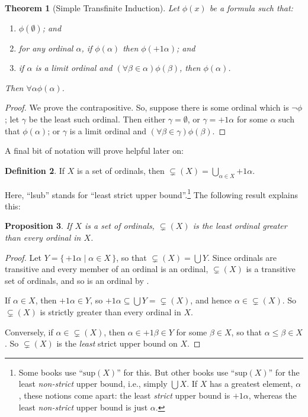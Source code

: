 \documentclass[10pt,a4paper]{article}
\makeatletter
\theoremstyle{plain}
\newtheorem{thm}{Theorem}[section]
\newtheorem{prop}[thm]{Proposition}
\theoremstyle{definition}
\newtheorem{defn}[thm]{Definition}
\theoremstyle{remark}
\newcommand*{\ollabel}[1]{\label{#1}}
\newcommand{\olref}{\@ifnextchar[{\olref@i}{\olref@final}}
\def\olref@i[#1]{\@ifnextchar[{\olref@ii}{\olref@final}}
\def\olref@ii[#1]{\@ifnextchar[{\olref@iii}{\olref@final}}
\def\olref@iii[#1]{\olref@final}
\def\olref@final#1{\ref{#1}}
\providecommand{\ordsucc}{\mathord{+1}}
\providecommand{\Setabs}[2]{\{\, #1 \mid #2 \,\}}
\providecommand{\supstrict}{\subsetneq}
\makeatother
\begin{document}
\begin{thm}[Simple Transfinite Induction]\ollabel{simpletransrecursion}
Let $\phi(x)$ be a formula such that:
\begin{enumerate}
	\item $\phi(\emptyset)$; and
	\item for any ordinal $\alpha$, if $\phi(\alpha)$ then
	$\phi(\ordsucc{\alpha})$; and 
	\item if $\alpha$ is a limit ordinal and $(\forall \beta \in
	\alpha)\phi(\beta)$, then $\phi(\alpha)$.
\end{enumerate}
Then $\forall \alpha \phi(\alpha)$.
\end{thm}

\begin{proof}
We prove the contrapositive. So, suppose there is some ordinal which
is $\lnot\phi$; let $\gamma$ be the least such ordinal. Then either
$\gamma = \emptyset$, or $\gamma = \ordsucc{\alpha}$ for some $\alpha$
such that $\phi(\alpha)$; or $\gamma$ is a limit ordinal and $(\forall
\beta \in \gamma)\phi(\beta)$.
\end{proof}
\noindent
A final bit of notation will prove helpful later on:

\begin{defn}\ollabel{defsupstrict}
If $X$ is a  set of ordinals, then $\supstrict(X) = \bigcup_{\alpha
\in X} \ordsucc{\alpha}$.
\end{defn}
\noindent
Here, ``lsub'' stands for ``least strict upper bound''.\footnote{Some
books use ``$\text{sup}(X)$'' for this.  But other books use
``$\text{sup}(X)$'' for the least \emph{non-strict} upper bound, i.e.,
simply $\bigcup X$. If $X$ has a greatest element, $\alpha$, these
notions come apart: the least \emph{strict} upper bound is
$\ordsucc{\alpha}$, whereas the least \emph{non-strict} upper bound is
just $\alpha$.}  The following result explains this:

\begin{prop}
If $X$ is a set of ordinals, $\supstrict(X)$ is the least ordinal
greater than every ordinal in $X$.
\end{prop}

\begin{proof}
Let $Y = \Setabs{\ordsucc{\alpha}}{\alpha \in X}$, so that
$\supstrict(X) = \bigcup Y$. Since ordinals are transitive and every
member of an ordinal is an ordinal, $\supstrict(X)$ is a transitive
set of ordinals, and so is an ordinal by
\olref[basic]{corordtransitiveord}. 

If $\alpha \in X$, then $\ordsucc{\alpha} \in Y$, so $\ordsucc{\alpha}
\subseteq \bigcup Y = \supstrict(X)$, and hence $\alpha \in
\supstrict(X)$. So $\supstrict(X)$ is strictly greater than every
ordinal in $X$.

Conversely, if $\alpha \in \supstrict(X)$, then $\alpha \in
\ordsucc{\beta} \in Y$ for some $\beta \in X$, so that $\alpha \leq
\beta \in X$. So $\supstrict(X)$ is the \emph{least} strict upper
bound on $X$.
\end{proof}
\end{document}

